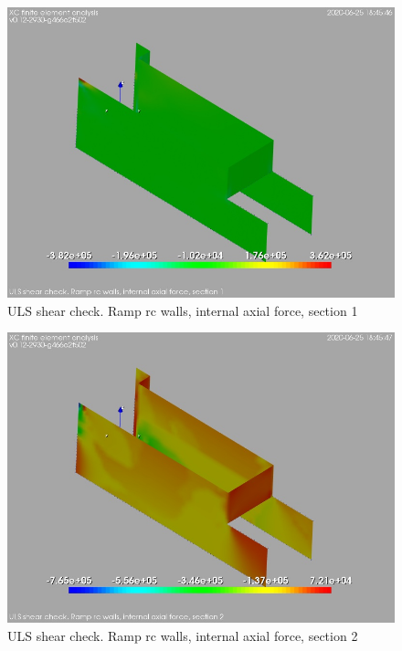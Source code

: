 \begin{figure}
\begin{center}
\includegraphics[width=\linewidth]{ramp_wall/resLC/text/graphics/shearULS/wallsNSect1}
\caption{ULS shear check. Ramp rc walls, internal axial force, section 1}
\end{center}
\end{figure}
\begin{figure}
\begin{center}
\includegraphics[width=\linewidth]{ramp_wall/resLC/text/graphics/shearULS/wallsNSect2}
\caption{ULS shear check. Ramp rc walls, internal axial force, section 2}
\end{center}
\end{figure}
